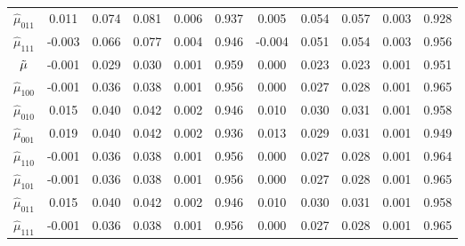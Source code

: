 \documentclass[
]{article}
\begin{document}
\begin{table}[!h]
{\begin{tabular}[t]{ccccccccccc}
$\hat{\mu}_{011}$ & 0.011 & 0.074 & 0.081 & 0.006 & 0.937 & 0.005 & 0.054 & 0.057 & 0.003 & 0.928\\
$\hat{\mu}_{111}$ & -0.003 & 0.066 & 0.077 & 0.004 & 0.946 & -0.004 & 0.051 & 0.054 & 0.003 & 0.956\\
$\Tilde{\mu}$ & -0.001 & 0.029 & 0.030 & 0.001 & 0.959 & 0.000 & 0.023 & 0.023 & 0.001 & 0.951\\
$\hat{\mu}_{100}$ & -0.001 & 0.036 & 0.038 & 0.001 & 0.956 & 0.000 & 0.027 & 0.028 & 0.001 & 0.965\\
$\hat{\mu}_{010}$ & 0.015 & 0.040 & 0.042 & 0.002 & 0.946 & 0.010 & 0.030 & 0.031 & 0.001 & 0.958\\
$\hat{\mu}_{001}$ & 0.019 & 0.040 & 0.042 & 0.002 & 0.936 & 0.013 & 0.029 & 0.031 & 0.001 & 0.949\\
$\hat{\mu}_{110}$ & -0.001 & 0.036 & 0.038 & 0.001 & 0.956 & 0.000 & 0.027 & 0.028 & 0.001 & 0.964\\
$\hat{\mu}_{101}$ & -0.001 & 0.036 & 0.038 & 0.001 & 0.956 & 0.000 & 0.027 & 0.028 & 0.001 & 0.965\\
$\hat{\mu}_{011}$ & 0.015 & 0.040 & 0.042 & 0.002 & 0.946 & 0.010 & 0.030 & 0.031 & 0.001 & 0.958\\
$\hat{\mu}_{111}$ & -0.001 & 0.036 & 0.038 & 0.001 & 0.956 & 0.000 & 0.027 & 0.028 & 0.001 & 0.965\\
\bottomrule
\end{tabular}}
\end{table}
\end{document}
